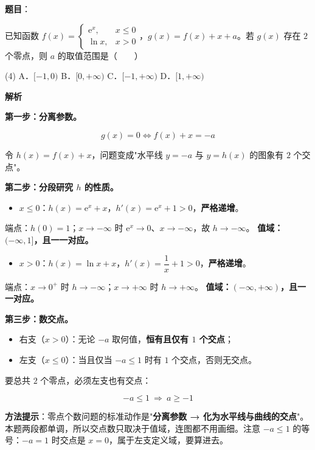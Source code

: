 \begin{answer}

\textbf{题目}：

已知函数 $f(x)=\begin{cases}\mathrm e^{x},&x\le0\\ \ln x,&x>0\end{cases}$，$g(x)=f(x)+x+a$。若 $g(x)$ 存在 $2$ 个零点，则 $a$ 的取值范围是\mbox{（　　）}

\begin{gkopts}(4)
\task A．$[-1,0)$
\task B．$[0,+\infty)$
\task C．$[-1,+\infty)$
\task D．$[1,+\infty)$
\end{gkopts}

\textbf{解析}

\textbf{第一步：分离参数。}

\nopagebreak[4]
\[g(x)=0\iff f(x)+x=-a\]

令 $h(x)=f(x)+x$，问题变成"水平线 $y=-a$ 与 $y=h(x)$ 的图象有 $2$ 个交点"。

\textbf{第二步：分段研究 $h$ 的性质。}

\begin{itemize}
\item $x\le0$：$h(x)=\mathrm e^{x}+x$，$h'(x)=\mathrm e^{x}+1>0$，\textbf{严格递增}。
\end{itemize}
  端点：$h(0)=1$；$x\to-\infty$ 时 $\mathrm e^{x}\to0$、$x\to-\infty$，故 $h\to-\infty$。
  \textbf{值域：$(-\infty,1]$，且一一对应。}

\begin{itemize}
\item $x>0$：$h(x)=\ln x+x$，$h'(x)=\dfrac1x+1>0$，\textbf{严格递增}。
\end{itemize}
  端点：$x\to0^{+}$ 时 $h\to-\infty$；$x\to+\infty$ 时 $h\to+\infty$。
  \textbf{值域：$(-\infty,+\infty)$，且一一对应。}

\textbf{第三步：数交点。}

\begin{itemize}
\item 右支（$x>0$）：无论 $-a$ 取何值，\textbf{恒有且仅有 $1$ 个交点}；
\item 左支（$x\le0$）：当且仅当 $-a\le1$ 时有 $1$ 个交点，否则无交点。
\end{itemize}

要总共 $2$ 个零点，必须左支也有交点：

\nopagebreak[4]
\[-a\le1\ \Longrightarrow\ a\ge-1\]

\begin{gktip}
\textbf{方法提示}：零点个数问题的标准动作是"\textbf{分离参数 → 化为水平线与曲线的交点}"。本题两段都单调，所以交点数只取决于值域，连图都不用画细。注意 $-a\le1$ 的等号：$-a=1$ 时交点是 $x=0$，属于左支定义域，要算进去。
\end{gktip}

\gkanswer{答案：C（$[-1,+\infty)$）}

\par\medskip

\end{answer}
